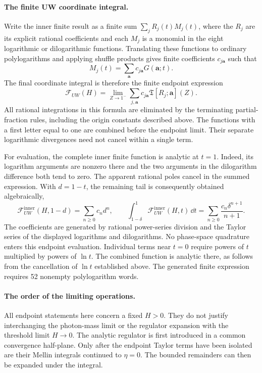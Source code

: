 \paragraph{The finite UW coordinate integral.}
Write the inner finite result as a finite sum
$\sum_j R_j(t)M_j(t)$, where the $R_j$ are its explicit rational
coefficients and each $M_j$ is a monomial in the eight logarithmic or
dilogarithmic functions. Translating these functions to ordinary
polylogarithms and applying shuffle products gives finite coefficients
$c_{j\boldsymbol a}$ such that
\begin{equation}
 M_j(t)=\sum_{\boldsymbol a}c_{j\boldsymbol a}
 G(\boldsymbol a;t).
\end{equation}
The final coordinate integral is therefore the finite endpoint expression
\begin{equation}
 \mathcal F_{UW}(H)=\lim_{Z\to1^-}
 \sum_{j,\boldsymbol a}c_{j\boldsymbol a}
 \mathfrak T[R_j;\boldsymbol a](Z).
 \label{eq:comp-real-UW-final-primitive}
\end{equation}
All rational integrations in this formula are eliminated by the terminating
partial-fraction rules, including the origin constants described above.
The functions with a first letter equal to one are combined before the
endpoint limit. Their separate logarithmic divergences need not cancel
within a single term.

For evaluation, the complete inner finite function is analytic at $t=1$.
Indeed, its logarithm arguments are nonzero there and the two arguments
in the dilogarithm difference both tend to zero. The apparent rational
poles cancel in the summed expression. With $d=1-t$, the remaining tail
is consequently obtained algebraically,
\begin{equation}
 \mathcal F_{UW}^{\mathrm{inner}}(H,1-d)=\sum_{n\geq0}c_n d^n,
 \qquad
 \int_{1-\delta}^1\mathcal F_{UW}^{\mathrm{inner}}(H,t)\,\dd t
 =\sum_{n\geq0}\frac{c_n\delta^{n+1}}{n+1}.
\end{equation}
The coefficients are generated by rational power-series division and the
Taylor series of the displayed logarithms and dilogarithms. No phase-space
quadrature enters this endpoint evaluation. Individual terms near $t=0$ require powers of $t$ multiplied by
powers of $\ln t$. The combined function is analytic there, as follows
from the cancellation of $\ln t$ established above.
The generated finite expression requires 52 nonempty polylogarithm words.
\paragraph{The order of the limiting operations.}
All endpoint statements here concern a fixed $H>0$. They do not justify
interchanging the photon-mass limit or the regulator expansion with the
threshold limit $H\to0$. The analytic regulator is first introduced in
a common convergence half-plane. Only after the endpoint Taylor terms
have been isolated are their Mellin integrals continued to $\eta=0$.
The bounded remainders can then be expanded under the integral.

